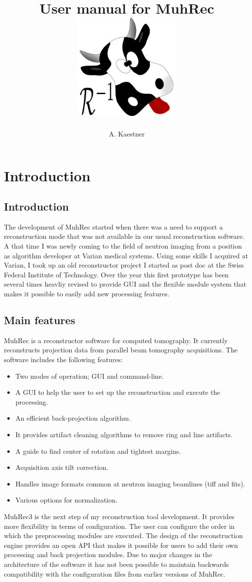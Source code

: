 \documentclass[a4paper]{scrreprt}
\title{User manual for MuhRec\\\vskip30pt\includegraphics[width=0.4\textwidth]{figures/muh_icon.pdf}}
\author{A. Kaestner}
\begin{document}
\maketitle
\tableofcontents
\chapter{Introduction}
\section{Introduction}
The development of MuhRec started when there was a need to support a reconstruction mode that was not available in our usual reconstruction software. A that time I was newly coming to the field of neutron imaging from a position as algorithm developer at Varian medical systems. Using some skills I acquired at Varian, I took up an old reconstructor project I started as post doc at the Swiss Federal Institute of Technology. Over the year this first prototype has been several times heavliy revised to provide GUI and the flexible module system that makes it possible to easily add new processing features. 

\section{Main features}
MuhRec is a reconstructor software for computed tomography. It currently reconstructs projection data from parallel beam tomography acquisitions. The software includes the following features:
\begin{itemize}
\item Two modes of operation; GUI and command-line.
\item A GUI to help the user to set up the reconstruction and execute the processing.
\item An efficient back-projection algorithm. 
\item It provides artifact cleaning algorithms to remove ring and line artifacts.
\item A guide to find center of rotation and tightest margins.
\item Acquisition axis tilt correction.
\item Handles image formats common at neutron imaging beamlines (tiff and fits).
\item Various options for normalization.
\end{itemize}

MuhRec3 is the next step of my reconstruction tool development. It provides more flexibility in terms of configuration. The user can configure the order in which the preprocessing modules are executed. The design of the reconstruction engine provides an open API that makes it possible for users to add their own processing and back projection modules. Due to major changes in the architecture of the software it has not been possible to maintain backwards compatibility with the configuration files from earlier versions of MuhRec. 
\end{document}
